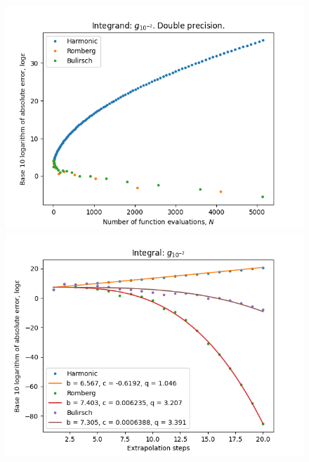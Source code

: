 \begin{figure}[H]
\centering
\begin{minipage}{0.45\textwidth}
\centering
\includegraphics[scale=0.45]{romberg_plots/g_hundredth.png}
\end{minipage}
\begin{minipage}{0.45\textwidth}
\centering
\includegraphics[scale=0.45]{romberg_plots/g_hundredth_hp_steps.png}
\end{minipage}
\end{figure}

